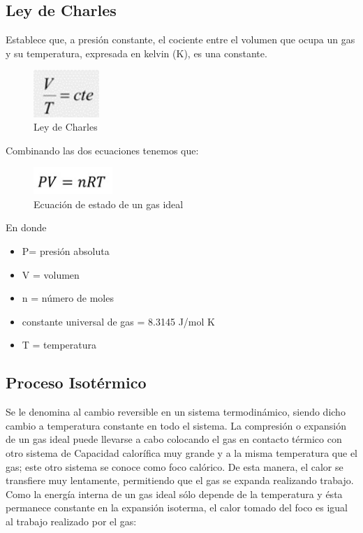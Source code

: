 \documentclass[journal,transmag]{IEEEtran}
\begin{document}
\subsection{\textbf{Ley de Charles}}
	Establece que, a presión constante, el cociente entre el volumen que ocupa un gas y su temperatura, expresada en kelvin (K), es una constante. 
	\begin{figure}[!h]
				\center
				\includegraphics[width=2.5cm]{img/3.jpeg}
				\caption{Ley de Charles}
				\label{f3}
	\end{figure}
	
Combinando las dos ecuaciones tenemos que: 
\begin{figure}[!h]
				\center
				\includegraphics[width=3cm]{img/4.jpeg}
				\caption{Ecuación de estado de un gas ideal}
				\label{f4}
	\end{figure}
	\vspace{30mm}

En donde 
\begin{itemize}
		\item P= presión absoluta
		\item V = volumen
		\item n = número de moles 
		\item constante universal de gas = 8.3145 J/mol K 
		\item T = temperatura 
	\end{itemize}

\subsection{\textbf{Proceso Isotérmico}}
Se le denomina al cambio reversible en un sistema termodinámico, siendo dicho cambio a temperatura constante en todo el sistema. La compresión o expansión de un gas ideal puede llevarse a cabo colocando el gas en contacto térmico con otro sistema de Capacidad calorífica muy grande y a la misma temperatura que el gas; este otro sistema se conoce como foco calórico. De esta manera, el calor se transfiere muy lentamente, permitiendo que el gas se expanda realizando trabajo. Como la energía interna de un gas ideal sólo depende de la temperatura y ésta permanece constante en la expansión isoterma, el calor tomado del foco es igual al trabajo realizado por el gas:  
\end{document}
